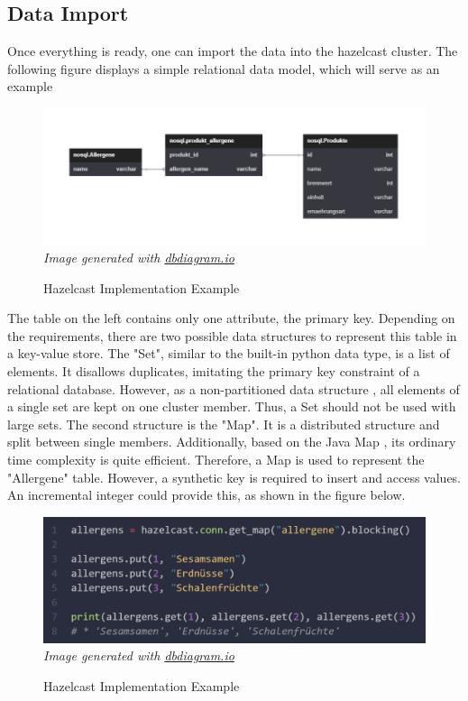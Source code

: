 \subsection{Data Import} \label{subsec:dataImportHazelcast}

Once everything is ready, one can import the data into the hazelcast cluster. The following figure displays 
a simple relational data model, which will serve as an example

\begin{figure}[H]
    \caption{Hazelcast Implementation Example} \label{fig:hazelcast.implementation.tables}
    \includegraphics[width=1\textwidth]{images/hazelcast.implementation.tables.png}
    \small\textit{Image generated with \href{https://dbdiagram.io/}{dbdiagram.io}}
\end{figure}

\noindent
The table on the left contains only one attribute, the primary key. Depending on the requirements, 
there are two possible data structures to represent this table in a key-value store. The "Set", similar to 
the built-in python data type, is a list of elements. It disallows duplicates, imitating the primary 
key constraint of a relational database. However, as a non-partitioned data structure 
\textcite{Hazelcast.DataStructure.Set}, 
all elements of a single set are kept on one cluster member. Thus, a Set should not be used with large sets. 
The second structure is the "Map". It is a distributed structure and split between single members. 
Additionally, based on the Java Map \textcite{Hazelcast.DataStructure.Map}, its ordinary time 
complexity is quite efficient. \textcite{Hazelcast.Java.Map} 
Therefore, a Map is used to represent the "Allergene" table. However, a synthetic key is required to 
insert and access values. An incremental integer could provide this, as shown in the figure below.


\begin{figure}[H]
    \caption{Hazelcast Implementation Example} \label{fig:hazelcast.allergens.map}
    \includegraphics[width=1\textwidth]{images/hazelcast.allergens.map.png}
    \small\textit{Image generated with \href{https://dbdiagram.io/}{dbdiagram.io}}
\end{figure}


